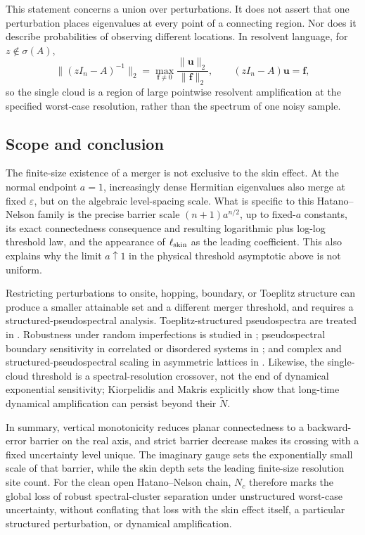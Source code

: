 \documentclass[review,hidelinks,onefignum,onetabnum]{siamart251216}
\begin{document}
This statement concerns a union over perturbations.  It does not assert that
one perturbation places eigenvalues at every point of a connecting region.
Nor does it describe probabilities of observing different locations.  In
resolvent language, for \(z\notin\sigma(A)\),
\[
 \lVert(zI_n-A)^{-1}\rVert_2
 =\max_{\boldsymbol f\neq0}
 \frac{\lVert\boldsymbol u\rVert_2}{\lVert\boldsymbol f\rVert_2},
 \qquad (zI_n-A)\boldsymbol u=\boldsymbol f,
\]
so the single cloud is a region of large pointwise resolvent amplification at the specified
worst-case resolution, rather than the spectrum of one noisy sample.

\subsection{Scope and conclusion}

The finite-size existence of a merger is not exclusive to the skin effect.
At the normal endpoint \(a=1\), increasingly dense Hermitian eigenvalues also
merge at fixed \(\varepsilon\), but on the algebraic level-spacing scale.
What is specific to this Hatano--Nelson family is the precise barrier scale
\((n+1)a^{n/2}\), up to fixed-\(a\) constants, its exact connectedness
consequence and resulting logarithmic plus log-log threshold law, and the
appearance of \(\ell_{\rm skin}\) as the leading coefficient.  This also
explains why the limit \(a\uparrow1\) in the physical threshold asymptotic
above is not uniform.

Restricting perturbations to onsite, hopping, boundary, or Toeplitz
structure can produce a smaller attainable set and a different merger
threshold, and requires a structured-pseudospectral analysis.
Toeplitz-structured pseudospectra are treated in
\cite{BottcherGrudsky2005,ButtaGuglielmiNoschese2012}.  Robustness under
random imperfections is studied in \cite{AmmariEtAl2024Stability};
pseudospectral boundary sensitivity in correlated or disordered systems in
\cite{OkumaSato2021}; and complex and structured-pseudospectral scaling in
asymmetric lattices in \cite{KiorpelidisMakris2025}.  Likewise, the
single-cloud threshold is a spectral-resolution crossover, not the end of
dynamical exponential sensitivity; Kiorpelidis and Makris explicitly show
that long-time dynamical amplification can persist beyond their
\(\widetilde N\).

In summary, vertical monotonicity reduces planar connectedness to a
backward-error barrier on the real axis, and strict barrier decrease makes
its crossing with a fixed uncertainty level unique.  The imaginary gauge
sets the exponentially small scale of that barrier, while the skin depth
sets the leading finite-size resolution site count.  For the clean open
Hatano--Nelson chain, \(N_c\) therefore marks the global loss of robust
spectral-cluster separation under unstructured worst-case uncertainty,
without conflating that loss with the skin effect itself, a particular
structured perturbation, or dynamical amplification.
\end{document}
